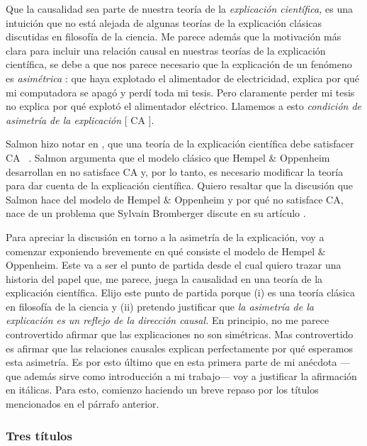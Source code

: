 Que la causalidad sea parte de nuestra teoría de la
\emph{ explicación científica, } es una intuición que no
está alejada de algunas teorías de la explicación
clásicas discutidas en filosofía de la ciencia. Me
parece además que la motivación más clara para incluir
una relación causal en nuestras teorías de la
explicación científica, se debe a que nos parece
necesario que la explicación de un fenómeno es \emph{ asimétrica }: que haya explotado el alimentador de
electricidad, explica por qué mi computadora se apagó
y perdí toda mi tesis. Pero claramente perder mi tesis
no explica por qué explotó el alimentador eléctrico.
Llamemos a esto \emph{ condición de asimetría de la
explicación } [ CA ].

Salmon hizo notar en , que una
teoría de la explicación científica debe satisfacer CA
~. Salmon argumenta que el
modelo clásico que Hempel $\&$ Oppenheim desarrollan en
 no satisface CA y, por lo
tanto, es necesario modificar la teoría para dar
cuenta de la explicación científica. Quiero resaltar
que la discusión que Salmon hace del modelo de Hempel
$\&$ Oppenheim y por qué no satisface CA, nace de un
problema que Sylvain Bromberger discute en su artículo
.

Para apreciar la discusión en torno a la asimetría de
la explicación, voy a comenzar exponiendo brevemente
en qué consiste el modelo de Hempel $\&$ Oppenheim.
Este va a ser el punto de partida desde el cual quiero
trazar una historia del papel que, me parece, juega la
causalidad en una teoría de la explicación científica.
Elijo este punto de partida porque (i) es una
teoría clásica en filosofía de la ciencia y (ii)
pretendo justificar que \emph{ la asimetría de la
explicación es un reflejo de la dirección causal.
} En principio, no me parece controvertido afirmar que
las explicaciones no son simétricas. Mas controvertido
es afirmar que las relaciones causales explican
perfectamente por qué esperamos esta asimetría. Es por
esto último que en esta primera parte de mi anécdota
---que además sirve como introducción a mi trabajo---
voy a justificar la afirmación en itálicas. Para esto,
comienzo haciendo un breve repaso por los títulos
mencionados en el párrafo anterior.

\subsubsection{ Tres títulos }

